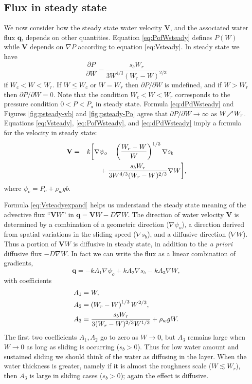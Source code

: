 \documentclass[gmd]{copernicus}   %
\newcommand\bV{\mathbf{V}}
\newcommand\bq{\mathbf{q}}
\newcommand{\grad}{\nabla}
\begin{document}
\subsection{Flux in steady state}  We now consider how the steady state water velocity $\bV$, and the associated water flux $\bq$, depends on other quantities.  Equation \eqref{eq:PofWsteady} defines $P(W)$ while $\bV$ depends on $\grad P$ according to equation \eqref{eq:Vsteady}.  In steady state we have
\begin{equation}
\frac{\partial P}{\partial W} = \frac{s_b W_r}{3 W^{4/3} (W_r - W)^{2/3}} \label{eq:dPdWsteady}
\end{equation}
if $W_c < W < W_r$.  If $W\le W_c$ or $W=W_r$ then $\partial P/\partial W$ is undefined, and if $W>W_r$ then $\partial P/\partial W=0$.  Note that the condition $W_c < W < W_r$ corresponds to the pressure condition $0 < P < P_o$ in steady state.  Formula \eqref{eq:dPdWsteady} and Figures \ref{fig:psteady-vb} and \ref{fig:psteady-Po} agree that $\partial P / \partial W \to \infty$ as $W \!\!\nearrow\! W_r$.  Equations \eqref{eq:Vsteady}, \eqref{eq:PofWsteady}, and \eqref{eq:dPdWsteady} imply a formula for the velocity in steady state:
\begin{align}
\bV &= - k \bigg[\grad \psi_o - \left(\frac{W_r - W}{W}\right)^{1/3} \grad s_b \label{eq:Vsteadyexpand} \\
    & \qquad \qquad + \frac{s_b W_r}{3 W^{4/3} (W_r - W)^{2/3}} \grad W\bigg], \notag
\end{align}
where $\psi_o = P_o + \rho_w g b$.

Formula \eqref{eq:Vsteadyexpand} helps us understand the steady state meaning of the advective flux ``$\bV W$'' in $\bq=\bV W - D \grad W$.  The direction of water velocity $\bV$ is determined by a combination of a geometric direction ($\grad \psi_o$), a direction derived from spatial variations in the sliding speed ($\grad s_b$), and a diffusive direction ($\grad W$).  Thus a portion of $\bV W$ is diffusive in steady state, in addition to the \emph{a priori} diffusive flux $- D \grad W$.  In fact we can write the flux as a linear combination of gradients,
\begin{equation}
\bq = - k A_1 \grad \psi_o + k A_2 \grad s_b - k A_3 \grad W,  \label{eq:qabstract}
\end{equation}
with coefficients
\begin{align}
&A_1 = W, \label{eq:qcoefficient} \\
&A_2 = \left(W_r - W\right)^{1/3} W^{2/3}, \notag \\
&A_3 = \frac{s_b W_r}{3 (W_r - W)^{2/3} W^{1/3}} + \rho_w g W. \notag
\end{align}
The first two coefficients $A_1,A_2$ go to zero as $W\to 0$, but $A_3$ remains large when $W\to 0$ as long as sliding is occurring ($s_b > 0$).  Thus for low water amount and sustained sliding we should think of the water as diffusing in the layer.  When the water thickness is greater, namely if it is almost the roughness scale ($W\lesssim W_r$), then $A_3$ is large in sliding cases ($s_b>0$); again the effect is diffusive.
\end{document}
